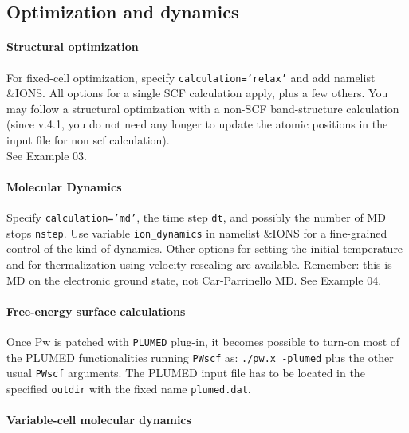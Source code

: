 \documentclass[12pt,a4paper]{article}
\begin{document}
\subsection{Optimization and dynamics}

\paragraph{Structural optimization}
For fixed-cell optimization, specify \texttt{calculation='relax'} and 
add namelist \&IONS. All options for a single SCF calculation apply, 
plus a few others. You
may follow a structural optimization with a non-SCF band-structure
calculation (since v.4.1, you do not need any longer to update the 
atomic positions in the input file for non scf calculation).\\
See Example 03.

\paragraph{Molecular Dynamics} 
Specify \texttt{calculation='md'}, the time step \texttt{dt}, and possibly the number of MD stops \texttt{nstep}.
Use variable \texttt{ion\_dynamics} in namelist \&IONS for a fine-grained control
of the kind of dynamics. Other options for setting the initial
temperature and for thermalization using velocity rescaling are
available. Remember: this is MD on the electronic ground state, not
Car-Parrinello MD.
See Example 04.

\paragraph{Free-energy surface calculations}
Once Pw is patched with \texttt{PLUMED} plug-in, it becomes possible to turn-on most of the PLUMED functionalities
running \texttt{PWscf} as: \texttt{./pw.x -plumed} plus the other usual \texttt{PWscf} arguments. The PLUMED input file has to be located in the specified \texttt{outdir} with
the fixed name \texttt{plumed.dat}.

\paragraph{Variable-cell molecular dynamics}
\end{document}
